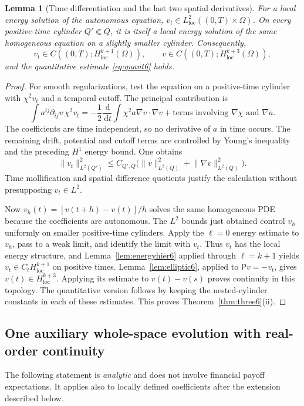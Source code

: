 \documentclass[11pt,a4paper]{article}
\newtheorem{lemma}[theorem]{Lemma}
\theoremstyle{definition}\newtheorem{definition}{Definition}[section]\newtheorem{example}[theorem]{Example}
\theoremstyle{remark}\newtheorem{remark}[theorem]{Remark}\newtheorem{remarkSix}{Remark}[section]
\newcommand{\loc}{\mathrm{loc}}
\newcommand{\dd}{\,\mathrm d}
\newcommand{\norm}[1]{\lVert #1\rVert}
\begin{document}
\begin{lemma}[Time differentiation and the last two spatial derivatives]\label{lem:timediff6}
For a local energy solution of the autonomous equation, $v_t\in L^2_{\loc}((0,T)\times\Omega)$. On every positive-time cylinder $Q'\Subset Q$, it is itself a local energy solution of the \emph{same homogeneous equation} on a slightly smaller cylinder. Consequently,
\begin{equation}\label{eq:lastB6}
 v_t\in C((0,T);H^{k+1}_{\loc}(\Omega)),
 \qquad v\in C((0,T);H^{k+3}_{\loc}(\Omega)),
\end{equation}
and the quantitative estimate \eqref{eq:quant6} holds.
\end{lemma}
\begin{proof}
For smooth regularizations, test the equation on a positive-time cylinder with $\chi^2v_t$ and a temporal cutoff. The principal contribution is
\[
 \int a^{ij}\partial_{ij}v\,\chi^2v_t
 =-\frac12\frac{\dd}{\dd t}\int\chi^2 a\nabla v\cdot\nabla v
   +\text{terms involving }\nabla\chi\text{ and }\nabla a.
\]
The coefficients are time independent, so no derivative of $a$ in time occurs. The remaining drift, potential and cutoff terms are controlled by Young's inequality and the preceding $H^1$ energy bound. One obtains
\begin{equation}\label{eq:vtboundB6}
 \norm{v_t}_{L^2(Q')}^2\le C_{Q',Q}
 \bigl(\norm v_{L^2(Q)}^2+\norm{\nabla v}_{L^2(Q)}^2\bigr).
\end{equation}
Time mollification and spatial difference quotients justify the calculation without presupposing $v_t\in L^2$.

Now $v_h(t)=[v(t+h)-v(t)]/h$ solves the same homogeneous PDE because the coefficients are autonomous. The $L^2$ bounds just obtained control $v_h$ uniformly on smaller positive-time cylinders. Apply the $\ell=0$ energy estimate to $v_h$, pass to a weak limit, and identify the limit with $v_t$. Thus $v_t$ has the local energy structure, and Lemma~\ref{lem:energyhier6} applied through $\ell=k+1$ yields $v_t\in C_tH^{k+1}_{\loc}$ on positive times. Lemma~\ref{lem:elliptic6}, applied to $\mathsf Pv=-v_t$, gives $v(t)\in H^{k+3}_{\loc}$. Applying its estimate to $v(t)-v(s)$ proves continuity in this topology. The quantitative version follows by keeping the nested-cylinder constants in each of these estimates. This proves Theorem~\ref{thm:three6}(ii).
\end{proof}

\subsection{One auxiliary whole-space evolution with real-order continuity}
\label{subsec:auxB}
The following statement is \emph{analytic} and does not involve financial payoff expectations. It applies also to locally defined coefficients after the extension described below.
\end{document}
